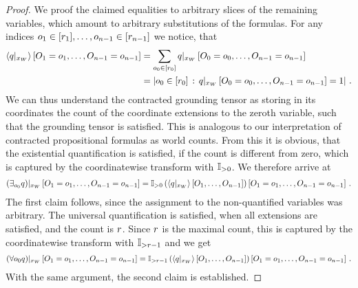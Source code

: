 \begin{proof}
    We proof the claimed equalities to arbitrary slices of the remaining variables, which amount to arbitrary substitutions of the formulas.
    For any indices $o_{1}\in[r_{1}],\ldots,o_{n-1}\in[r_{n-1}]$ we notice, that
    \begin{align*}
        \left\langle {q}|_{x_{W}}\right\rangle \left[ O_{1}=o_{1},\ldots,O_{n-1}=o_{n-1} \right]
        &= \sum_{o_{0}\in[r_{0}]} {q}|_{x_{W}} \left[O_{0}=o_{0},\ldots,O_{n-1}=o_{n-1}\right] \\
        &= \left|o_{0}\in[r_{0}] \, : \, {q}|_{x_{W}} \left[O_{0}=o_{0},\ldots,O_{n-1}=o_{n-1}\right]=1\right| \, .
    \end{align*}
    We can thus understand the contracted grounding tensor as storing in its coordinates the count of the coordinate extensions to the zeroth variable, such that the grounding tensor is satisfied.
    This is analogous to our interpretation of contracted propositional formulas as world counts.
    From this it is obvious, that the existential quantification is satisfied, if the count is different from zero, which is captured by the coordinatewise transform with $\mathbb{I}_{>0}$.
    We therefore arrive at
    \begin{align*}
        {\left(\exists_{o_{0}}q\right)}|_{x_{W}} \left[O_{1}=o_{1},\ldots,O_{n-1}=o_{n-1}\right] =
        {\mathbb{I}_{>0}}\left(\left\langle {q}|_{x_{W}}\right\rangle \left[ O_{1},\ldots,O_{n-1} \right]\right)\left[O_{1}=o_{1},\ldots,O_{n-1}=o_{n-1}\right] \, .
    \end{align*}
    The first claim follows, since the assignment to the non-quantified variables was arbitrary.
    The universal quantification is satisfied, when all extensions are satisfied, and the count is $r$.
    Since $r$ is the maximal count, this is captured by the coordinatewise transform with $\mathbb{I}_{>r-1}$ and we get
    \begin{align*}
        {\left(\forall{o_{0}}q\right)}|_{x_{W}} \left[O_{1}=o_{1},\ldots,O_{n-1}=o_{n-1}\right] =
        {\mathbb{I}_{>r-1}}\left(\left\langle {q}|_{x_{W}}\right\rangle \left[ O_{1},\ldots,O_{n-1} \right]\right)\left[O_{1}=o_{1},\ldots,O_{n-1}=o_{n-1}\right] \, .
    \end{align*}
    With the same argument, the second claim is established.
\end{proof}


